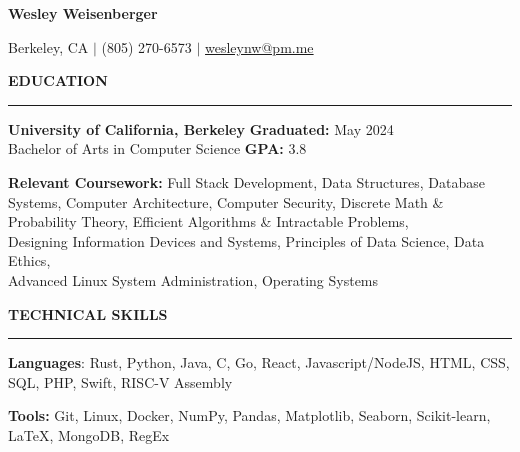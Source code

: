 \documentclass{article}
\begin{document}
\pagestyle{fancy}
\fancyhead{}\fancyfoot{}

\newcommand{\header}[1]{
    \vspace{4mm}
    {\large \noindent \textbf{#1}}
    \vspace{1.5mm}
    \hrule
    \vspace{2mm}
}

\begin{center}

    {\LARGE \textbf{Wesley Weisenberger}}

    \vspace{2mm}

    {\large Berkeley, CA  $\mid$ (805) 270-6573
        $\mid$
        \href{mailto:wesleynw@pm.me}{wesleynw@pm.me}

    }

\end{center}

\vspace{-2.5mm}

\header{EDUCATION}

\begin{adjustwidth}{1em}{1em}

    \textbf{University of California, Berkeley}
    \hfill
    \textbf{Graduated:} May 2024 \\
    Bachelor of Arts in Computer Science \hfill  \textbf{GPA:} 3.8

    \vspace{2.5mm}

    \textbf{Relevant Coursework:}
        Full Stack Development,
        Data Structures,
        Database Systems,
        Computer Architecture,
        Computer Security,
        Discrete Math \& Probability Theory,
        Efficient Algorithms \& Intractable Problems, \\
        Designing Information Devices and Systems,
        Principles of Data Science,
        Data Ethics, \\
        Advanced Linux System Administration,
        Operating Systems

\end{adjustwidth}

\header{TECHNICAL SKILLS}

\begin{adjustwidth}{1em}{1em}

    \textbf{Languages}: Rust, Python, Java, C, Go, React, Javascript/NodeJS, HTML, CSS, SQL, PHP, Swift, RISC-V Assembly

    \vspace{1mm}

    \textbf{Tools:} Git, Linux, Docker, NumPy, Pandas, Matplotlib, Seaborn, Scikit-learn, \LaTeX, MongoDB, RegEx

\end{adjustwidth}
\end{document}

